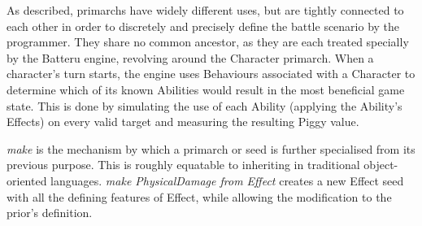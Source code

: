 \noindent As described, primarchs have widely different uses, but are tightly connected to each other in order to discretely and precisely define the battle scenario by the programmer. They share no common ancestor, as they are each treated specially by the Batteru engine, revolving around the Character primarch. When a character's turn starts, the engine uses Behaviours associated with a Character to determine which of its known Abilities would result in the most beneficial game state. This is done by simulating the use of each Ability (applying the Ability's Effects) on every valid target and measuring the resulting Piggy value.

\emph{make} is the mechanism by which a primarch or seed is further specialised from its previous purpose. This is roughly equatable to inheriting in traditional object-oriented languages. \emph{make PhysicalDamage from Effect} creates a new Effect seed with all the defining features of Effect, while allowing the modification to the prior's definition.
